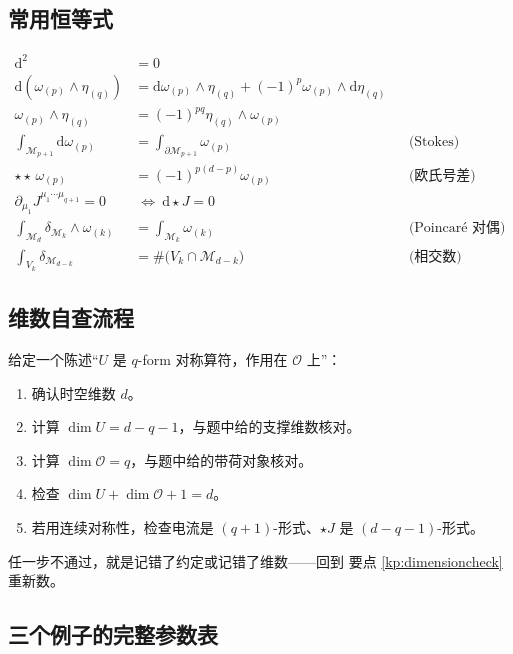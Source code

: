 \documentclass[UTF8,a4paper,11pt]{ctexart}
\theoremstyle{plain}
\theoremstyle{definition}
\theoremstyle{remark}
\newcommand{\ext}{\mathrm{d}}          %
\newcommand{\hs}{\star}                %
\newcommand{\Op}{\mathcal{O}}
\newcommand{\Mfd}{\mathcal{M}}
\newcommand{\Uop}{U}
\begin{document}
\subsection{常用恒等式}

\begin{align}
  \ext^2&=0 \\
  \ext(\omega_{(p)}\wedge\eta_{(q)})
    &=\ext\omega_{(p)}\wedge\eta_{(q)}
     +(-1)^p\omega_{(p)}\wedge \ext\eta_{(q)} \\
  \omega_{(p)}\wedge\eta_{(q)}&=(-1)^{pq}\eta_{(q)}\wedge\omega_{(p)} \\
  \int_{\Mfd_{p+1}}\ext\omega_{(p)}
    &=\int_{\partial\Mfd_{p+1}}\omega_{(p)}
    &&\text{(Stokes)}\\
  \hs\hs\,\omega_{(p)}&=(-1)^{p(d-p)}\omega_{(p)}
    &&\text{(欧氏号差)}\\
  \partial_{\mu_1}J^{\mu_1\cdots\mu_{q+1}}=0
    &\ \Longleftrightarrow\ \ext\hs J=0 \\
  \int_{\Mfd_d}\delta_{\Mfd_k}\wedge\omega_{(k)}
    &=\int_{\Mfd_k}\omega_{(k)}
    &&\text{(Poincaré 对偶)}\\
  \int_{V_{k}}\delta_{\Mfd_{d-k}}
    &=\#\big(V_k\cap \Mfd_{d-k}\big)
    &&\text{(相交数)}
\end{align}

\subsection{维数自查流程}

给定一个陈述“$\Uop$ 是 $q$-form 对称算符，作用在 $\Op$ 上”：

\begin{enumerate}[label=\textbf{步骤 \arabic*.},leftmargin=1.9cm]
  \item 确认时空维数 $d$。
  \item 计算 $\dim\Uop=d-q-1$，与题中给的支撑维数核对。
  \item 计算 $\dim\Op=q$，与题中给的带荷对象核对。
  \item 检查 $\dim\Uop+\dim\Op+1=d$。
  \item 若用连续对称性，检查电流是 $(q+1)$-形式、$\hs J$ 是
        $(d-q-1)$-形式。
\end{enumerate}

任一步不通过，就是记错了约定或记错了维数——回到
要点 \ref{kp:dimensioncheck} 重新数。

\subsection{三个例子的完整参数表}
\end{document}
